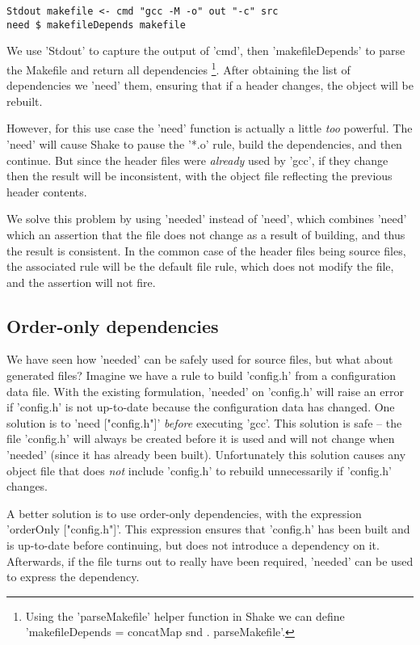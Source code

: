 \begin{lstlisting}
Stdout makefile <- cmd "gcc -M -o" out "-c" src
need $ makefileDepends makefile
\end{lstlisting}

\noindent We use \lst'Stdout' to capture the output of \lst'cmd', then \lst'makefileDepends' to parse the Makefile and return all dependencies \footnote{Using the \lst'parseMakefile' helper function in Shake we can define \lst'makefileDepends = concatMap snd . parseMakefile'.}. After obtaining the list of dependencies we \lst'need' them, ensuring that if a header changes, the object will be rebuilt.

However, for this use case the \lst'need' function is actually a little \emph{too} powerful. The \lst'need' will cause Shake to pause the \lst'*.o' rule, build the dependencies, and then continue. But since the header files were \emph{already} used by \lst'gcc', if they change then the result will be inconsistent, with the object file reflecting the previous header contents.

We solve this problem by using \lst'needed' instead of \lst'need', which combines \lst'need' which an assertion that the file does not change as a result of building, and thus the result is consistent. In the common case of the header files being source files, the associated rule will be the default file rule, which does not modify the file, and the assertion will not fire.

\subsection{Order-only dependencies}

We have seen how \lst'needed' can be safely used for source files, but what about generated files? Imagine we have a rule to build \lst'config.h' from a configuration data file. With the existing formulation, \lst'needed' on \lst'config.h' will raise an error if \lst'config.h' is not up-to-date because the configuration data has changed. One solution is to \lst'need ["config.h"]' \emph{before} executing \lst'gcc'. This solution is safe -- the file \lst'config.h' will always be created before it is used and will not change when \lst'needed' (since it has already been built). Unfortunately this solution causes any object file that does \emph{not} include \lst'config.h' to rebuild unnecessarily if \lst'config.h' changes.

A better solution is to use order-only dependencies, with the expression \lst'orderOnly ["config.h"]'. This expression ensures that \lst'config.h' has been built and is up-to-date before continuing, but does not introduce a dependency on it. Afterwards, if the file turns out to really have been required, \lst'needed' can be used to express the dependency.

